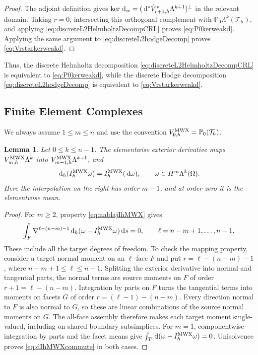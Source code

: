 \documentclass[10pt]{amsart}
\numberwithin{equation}{section}
\newtheorem{lemma}[theorem]{Lemma}
\newcommand{\dd}{\,{\rm d}}
\begin{document}
\begin{proof}
The adjoint definition gives
$\ker\dd_w=(\dd^*\mathring V_{r+1,h}^{*}\Lambda^{k+1})^\perp$
in the relevant domain. Taking $r=0$, intersecting this orthogonal complement
with $\mathbb P_0\Lambda^k(\mathcal T_h)$, and applying
\eqref{eq:discreteL2HelmholtzDecompCRL} proves \eqref{eq:P0kerweakd}.
Applying the same argument to \eqref{eq:discreteL2hodgeDecomp} proves
\eqref{eq:Vrstarkerweakd}.
\end{proof}

Thus, the discrete Helmholtz decomposition
\eqref{eq:discreteL2HelmholtzDecompCRL} is equivalent to
\eqref{eq:P0kerweakd}, while the discrete Hodge decomposition
\eqref{eq:discreteL2hodgeDecomp} is equivalent to
\eqref{eq:Vrstarkerweakd}.



\subsection{Finite Element Complexes}

We always assume $1\leq m\leq n$ and use the convention
$V_{0,h}^{\rm MWX}=\mathbb P_0(\mathcal T_h)$.
\begin{lemma}
Let $0\leq k\leq n-1$. The elementwise exterior derivative maps
$V_{m,h}^{\rm MWX}\Lambda^k$ into
$V_{m-1,h}^{\rm MWX}\Lambda^{k+1}$, and
\begin{equation}\label{eq:dIhMWXcommute}
\dd_h(I_{h}^{\rm MWX}\omega)=I_{h}^{\rm MWX}(\dd\omega),
\qquad\omega\in H^m\Lambda^k(\Omega).
\end{equation}
Here the interpolation on the right has order $m-1$, and at order zero
it is the elementwise mean.
\end{lemma}
\begin{proof}
For $m\geq2$, property \eqref{eq:nablajIhMWX} gives
\[
\int_F\nabla^{\ell-(n-m)-1}\dd_h(\omega-I_h^{\rm MWX}\omega)\dd s=0,
\qquad \ell=n-m+1,\ldots,n-1.
\]
These include all the target degrees of freedom. To check the mapping
property, consider a target normal moment on an $\ell$-face $F$ and put
$r=\ell-(n-m)-1$, where $n-m+1\leq\ell\leq n-1$.
Splitting the exterior derivative into normal and tangential parts,
the normal terms are source moments on $F$ of order
$r+1=\ell-(n-m)$.
Integration by parts on $F$ turns the tangential terms into moments
on facets $G$ of order $r=(\ell-1)-(n-m)$.
Every direction normal to $F$ is also normal to $G$, so these are
linear combinations of the source normal moments on $G$.
The all-face assembly therefore makes each target moment single-valued,
including on shared boundary subsimplices.
For $m=1$, componentwise integration by parts and the facet means give
$\int_T\dd(\omega-I_h^{\rm MWX}\omega)=0$.
Unisolvence proves \eqref{eq:dIhMWXcommute} in both cases.
\end{proof}
\end{document}
